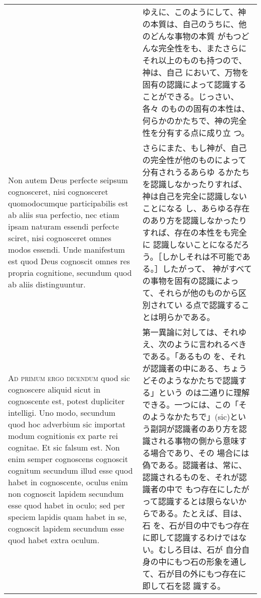 \documentclass[10pt]{jsarticle} %
\begin{document}
\begin{longtable}{p{21em}p{21em}}
&

ゆえに、このようにして、神の本質は、自己のうちに、他のどんな事物の本質
がもつどんな完全性をも、またさらにそれ以上のものも持つので、神は、自己
において、万物を固有の認識によって認識することができる。じっさい、各々
のものの固有の本性は、何らかのかたちで、神の完全性を分有する点に成り立
つ。


\\


Non autem Deus perfecte seipsum cognosceret, nisi cognosceret
quomodocumque participabilis est ab aliis sua perfectio, nec etiam
ipsam naturam essendi perfecte sciret, nisi cognosceret omnes modos
essendi. Unde manifestum est quod Deus cognoscit omnes res propria
cognitione, secundum quod ab aliis distinguuntur.


&

さらにまた、もし神が、自己の完全性が他のものによって分有されうるあらゆ
るかたちを認識しなかったりすれば、神は自己を完全に認識しないことになる
し、あらゆる存在のあり方を認識しなかったりすれば、存在の本性をも完全に
認識しないことになるだろう。［しかしそれは不可能である。］したがって、
神がすべての事物を固有の認識によって、それらが他のものから区別されてい
る点で認識することは明らかである。


\\


{\scshape Ad primum ergo dicendum} quod sic cognoscere aliquid sicut
in cognoscente est, potest dupliciter intelligi. Uno modo, secundum
quod hoc adverbium sic importat modum cognitionis ex parte rei
cognitae. Et sic falsum est. Non enim semper cognoscens cognoscit
cognitum secundum illud esse quod habet in cognoscente, oculus enim
non cognoscit lapidem secundum esse quod habet in oculo; sed per
speciem lapidis quam habet in se, cognoscit lapidem secundum esse quod
habet extra oculum.

&

第一異論に対しては、それゆえ、次のように言われるべきである。「あるもの
を、それが認識者の中にある、ちょうどそのようなかたちで認識する」という
のは二通りに理解できる。一つには、この「そのようなかたちで」(sic)とい
う副詞が認識者のあり方を認識される事物の側から意味する場合であり、その
場合には偽である。認識者は、常に、認識されるものを、それが認識者の中で
もつ存在にしたがって認識するとは限らないからである。たとえば、目は、石
を、石が目の中でもつ存在に即して認識するわけではない。むしろ目は、石が
自分自身の中にもつ石の形象を通して、石が目の外にもつ存在に即して石を認
識する。


\\




\end{longtable}
\end{document}
